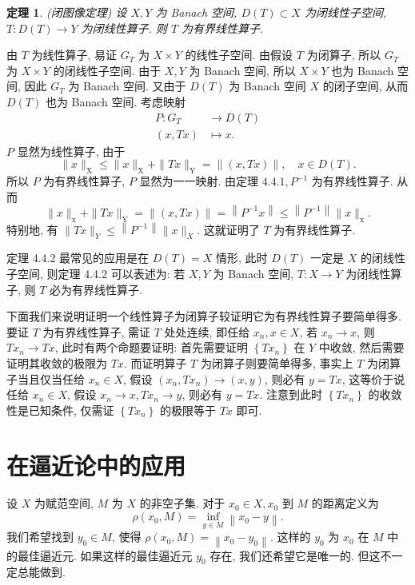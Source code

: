 \documentclass[openany]{ctexbook}
\makeatletter
\theoremstyle{kaiti}
\newtheorem{theorem}{定理}[section]
\theoremstyle{normal}
\renewenvironment{proof}[1][\proofname]{\par
    \pushQED{\qed}%
    \normalfont \topsep6\p@\@plus6\p@\relax
    \trivlist
    \item\relax
    {\heiti #1}\hspace{2\labelsep}\ignorespaces
  }{%
    \popQED\endtrivlist\@endpefalse
  }
\makeatother
\begin{document}
\begin{theorem}
(闭图像定理) 设 $X, Y$ 为 Banach 空间, $D(T) \subset X$ 为闭线性子空间, $T: D(T) \rightarrow Y$ 为闭线性算子. 则 $T$ 为有界线性算子.
\end{theorem}

\begin{proof}
由 $T$ 为线性算子, 易证 $G_{T}$ 为 $X \times Y$ 的线性子空间. 由假设 $T$ 为闭算子, 所以 $G_{T}$ 为 $X \times Y$ 的闭线性子空间. 由于 $X, Y$ 为 Banach 空间, 所以 $X \times Y$ 也为 Banach 空间, 因此 $G_{T}$ 为 Banach 空间. 又由于 $D(T)$ 为 Banach 空间 $X$ 的闭子空间, 从而 $D(T)$ 也为 Banach 空间. 考虑映射
$$
  \begin{aligned}
    P: G_{T} &\rightarrow D(T) \\
    (x, Tx) &\mapsto x.
  \end{aligned}
$$
$P$ 显然为线性算子, 由于
$$
\|x\|_{\mathrm{X}} \leqslant\|x\|_{\mathrm{X}}+\|T x\|_{\mathrm{Y}}=\|(x, T x)\|, \quad x \in D(T).
$$
所以 $P$ 为有界线性算子, $P$ 显然为一一映射. 由定理 $4.4.1, P^{-1}$ 为有界线性算子. 从而
$$
\|x\|_{\mathrm{x}}+\|T x\|_{\mathrm{Y}}=\|(x, T x)\|=\left\|P^{-1} x\right\| \leqslant\left\|P^{-1}\right\|\|x\|_{\mathrm{x}}.
$$
特别地, 有 $\|T x\|_{Y} \leqslant\left\|P^{-1}\right\|\|x\|_{X}$. 这就证明了 $T$ 为有界线性算子.
\end{proof}

定理 4.4.2 最常见的应用是在 $D(T)=X$ 情形, 此时 $D(T)$ 一定是 $X$ 的闭线性子空间, 则定理 4.4.2 可以表述为: 若 $X, Y$ 为 Banach 空间, $T: X \rightarrow Y$ 为闭线性算子, 则 $T$ 必为有界线性算子.

下面我们来说明证明一个线性算子为闭算子较证明它为有界线性算子要简单得多. 要证 $T$ 为有界线性算子, 需证 $T$ 处处连续, 即任给 $x_n, x \in X$, 若 $x_n \rightarrow x$, 则 $T x_n \rightarrow T x$, 此时有两个命题要证明: 首先需要证明 $\left\{T x_n\right\}$ 在 $Y$ 中收敛, 然后需要证明其收敛的极限为 $T x$. 而证明算子 $T$ 为闭算子则要简单得多, 事实上 $T$ 为闭算子当且仅当任给 $x_n \in X$, 假设 $\left(x_n, T x_n\right) \rightarrow(x, y)$, 则必有 $y=T x$, 这等价于说任给 $x_n \in X$, 假设 $x_n \rightarrow x, T x_n \rightarrow y$, 则必有 $y=T x$. 注意到此时 $\left\{T x_n\right\}$ 的收敛性是已知条件, 仅需证 $\left\{T x_n\right\}$ 的极限等于 $T x$ 即可.

\section{在逼近论中的应用}

设 $X$ 为赋范空间, $M$ 为 $X$ 的非空子集. 对于 $x_0 \in X, x_0$ 到 $M$ 的距离定义为
$$
\rho\left(x_0, M\right)=\inf_{y \in M}\left\|x_0-y\right\|.
$$
我们希望找到 $y_0 \in M$, 使得 $\rho\left(x_0, M\right)=\left\|x_0-y_0\right\|$. 这样的 $y_0$ 为 $x_0$ 在 $M$ 中的最佳逼近元. 如果这样的最佳逼近元 $y_0$ 存在, 我们还希望它是唯一的. 但这不一定总能做到.
\end{document}
